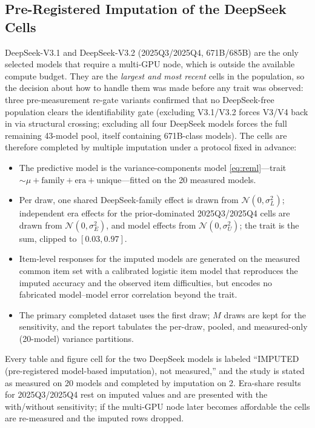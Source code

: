 \documentclass{ieeeaccess}
\theoremstyle{definition}
\theoremstyle{plain}
\begin{document}
\subsection{Pre-Registered Imputation of the DeepSeek Cells}
\label{sec:imputation}
DeepSeek-V3.1 and DeepSeek-V3.2 (2025Q3/2025Q4, 671B/685B) are the only
selected models that require a multi-GPU node, which is outside the available
compute budget. They are the \emph{largest and most recent} cells in the
population, so the decision about how to handle them was made before any trait
was observed: three pre-measurement re-gate variants confirmed that no
DeepSeek-free population clears the identifiability gate (excluding V3.1/V3.2
forces V3/V4 back in via structural crossing; excluding all four DeepSeek
models forces the full remaining 43-model pool, itself containing
671B-class models). The cells are therefore completed by multiple imputation
under a protocol fixed in advance:
\begin{itemize}
\item The predictive model is the variance-components model
  \eqref{eq:reml}---trait $\sim \mu + \mathrm{family} + \mathrm{era} +
  \mathrm{unique}$---fitted on the 20 measured models.
\item Per draw, one shared DeepSeek-family effect is drawn from
  $\mathcal{N}(0,\sigma^{2}_{L})$; independent era effects for the
  prior-dominated 2025Q3/2025Q4 cells are drawn from
  $\mathcal{N}(0,\sigma^{2}_{E})$, and model effects from
  $\mathcal{N}(0,\sigma^{2}_{U})$; the trait is the sum, clipped to $[0.03,0.97]$.
\item Item-level responses for the imputed models are generated on the measured
  common item set with a calibrated logistic item model that reproduces the
  imputed accuracy and the observed item difficulties, but encodes no
  fabricated model--model error correlation beyond the trait.
\item The primary completed dataset uses the first draw; $M$ draws are kept for
  the sensitivity, and the report tabulates the per-draw, pooled, and
  measured-only (20-model) variance partitions.
\end{itemize}
Every table and figure cell for the two DeepSeek models is labeled
``IMPUTED (pre-registered model-based imputation), not measured,'' and the
study is stated as measured on 20 models and completed by imputation on 2.
Era-share results for 2025Q3/2025Q4 rest on imputed values and are presented
with the with/without sensitivity; if the multi-GPU node later becomes
affordable the cells are re-measured and the imputed rows dropped.
\end{document}
